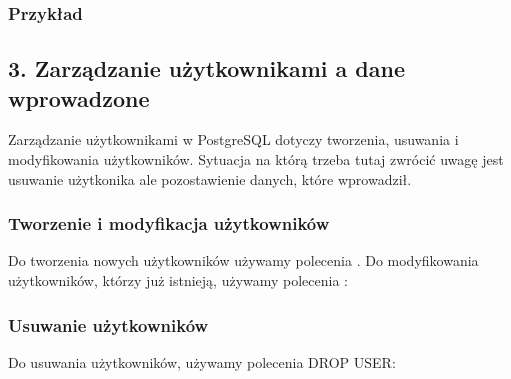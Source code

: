 \documentclass[a4paper,11pt,openany,english]{sphinxmanual}
\begin{document}
\subsubsection{Przykład}
\label{\detokenize{rozdzial2/Bezpieczenstwo/index:przyklad}}
\begin{sphinxVerbatim}[commandchars=\\\{\}]
      
     
\end{sphinxVerbatim}


\subsection{3. Zarządzanie użytkownikami a dane wprowadzone}
\label{\detokenize{rozdzial2/Bezpieczenstwo/index:zarzadzanie-uzytkownikami-a-dane-wprowadzone}}
\sphinxAtStartPar
Zarządzanie użytkownikami w PostgreSQL dotyczy tworzenia, usuwania i modyfikowania użytkowników. Sytuacja na którą trzeba tutaj zwrócić uwagę jest usuwanie użytkonika ale pozostawienie danych, które wprowadził.


\subsubsection{Tworzenie i modyfikacja użytkowników}
\label{\detokenize{rozdzial2/Bezpieczenstwo/index:tworzenie-i-modyfikacja-uzytkownikow}}
\sphinxAtStartPar
Do tworzenia nowych użytkowników używamy polecenia . Do modyfikowania użytkowników, którzy już istnieją, używamy polecenia :

\begin{sphinxVerbatim}[commandchars=\\\{\}]
     
     
\end{sphinxVerbatim}


\subsubsection{Usuwanie użytkowników}
\label{\detokenize{rozdzial2/Bezpieczenstwo/index:usuwanie-uzytkownikow}}
\sphinxAtStartPar
Do usuwania użytkowników, używamy polecenia {\color{red}\bfseries{}\textasciigrave{}\textasciigrave{}}DROP USER\textasciigrave{}:
\end{document}
